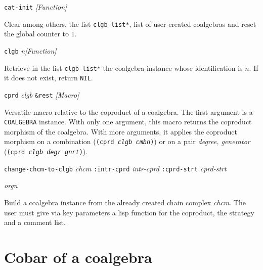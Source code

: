 {\parindent=0mm
{\leftskip=5mm
{\tt cat-init} \hfill {\em [Function]} \par}
{\leftskip=15mm
Clear among others, the list {\tt *clgb-list*}, list of user created coalgebras  and reset
the global counter to $1$. \par}
{\leftskip=5mm
{\tt clgb} {\em n}\hfill {\em [Function]} \par}
{\leftskip=15mm
Retrieve in the list {\tt *clgb-list*} the coalgebra instance whose identification is $n$.
If it does not exist, return {\tt NIL}. \par}
{\leftskip=5mm
{\tt cprd} {\em clgb} {\tt \&rest} \hfill {\em [Macro]} \par}
{\leftskip=15mm
Versatile macro relative to the coproduct of a coalgebra. The first argument is a {\tt COALGEBRA}
instance. With only one argument, this macro returns the coproduct morphism of the coalgebra.
With more arguments, it applies the coproduct morphism on a combination ({\tt (cprd {\em clgb cmbn})})
or on a pair {\em degree, generator} ({\tt (cprd {\em clgb degr gnrt})}). \par}
{\leftskip=5mm
{\tt change-chcm-to-clgb} {\em chcm} {\tt :intr-cprd} {\em intr-cprd} {\tt :cprd-strt} {\em cprd-strt} \par
\hspace* {10mm}{\tt :orgn} {\em orgn} \par}
{\leftskip=15mm
Build a coalgebra instance from the already created chain complex {\em chcm}. The user must give via key
parameters a lisp function for the coproduct, the strategy and a comment list. \par}
}

\section {Cobar of a coalgebra}

